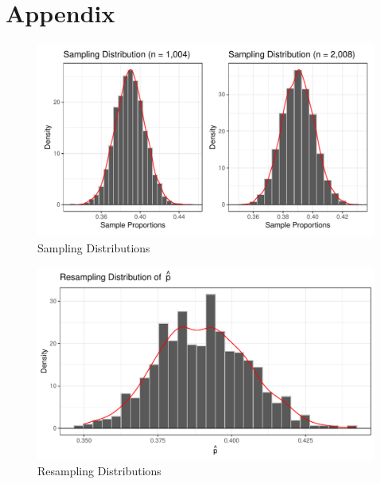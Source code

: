 \documentclass{article}\usepackage[]{graphicx}\usepackage[]{xcolor}
\makeatletter
\def\maxwidth{ %
  \ifdim\Gin@nat@width>\linewidth
    \linewidth
  \else
    \Gin@nat@width
  \fi
}
\newenvironment{knitrout}{}{} %
\makeatother
\begin{document}
\section{Appendix}


\begin{figure}[H]
\begin{center}
\begin{knitrout}
\color{fgcolor}

{\centering \includegraphics[width=\maxwidth]{figure/unnamed-chunk-4-1} 

}


\end{knitrout}
\caption{Sampling Distributions}
\label{plot1} 
\end{center}
\end{figure}


\begin{figure}[H]
\begin{center}
\begin{knitrout}
\color{fgcolor}

{\centering \includegraphics[width=\maxwidth]{figure/unnamed-chunk-5-1} 

}


\end{knitrout}
\caption{Resampling Distributions}
\label{plot2} 
\end{center}
\end{figure}
\end{document}
